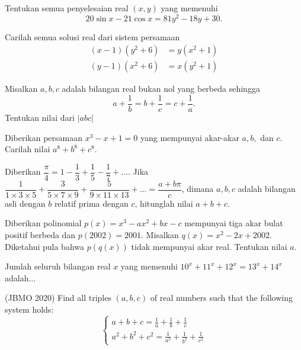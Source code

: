 \documentclass[12pt]{scrartcl}
\begin{document}
    \begin{soalbaru}
    Tentukan semua penyelesaian real $(x,y)$ yang memenuhi
    $$20\sin x-21 \cos x = 81y^2-18y+30.$$
    \end{soalbaru}
    
    \begin{soalbaru}
    Carilah semua solusi real dari sistem persamaan
    \begin{align*}
        (x-1)(y^2+6) &= y(x^2+1)\\
        (y-1)(x^2+6) &= x(y^2+1)
    \end{align*}
    \end{soalbaru}
    
    \begin{soalbaru}
    Misalkan $a,b,c$ adalah bilangan real bukan nol yang berbeda sehingga 
    $$a+\dfrac{1}{b}=b+\dfrac{1}{c}=c+\dfrac{1}{a}.$$
    Tentukan nilai dari $|abc|$
    \end{soalbaru}
    
    \begin{soalbaru}
		Diberikan persamaan $x^3-x+1=0$ yang mempunyai akar-akar $a,b,$ dan $c$. Carilah nilai $a^8+b^8+c^8$.
	\end{soalbaru}
	
	\begin{soalbaru}
			Diberikan $\dfrac{\pi}{4} = 1 - \dfrac{1}{3}+\dfrac{1}{5}-\dfrac{1}{7}+\dots$. Jika  $\dfrac{1}{1 \times 3 \times 5}+\dfrac{3}{5 \times 7 \times 9}+\dfrac{5}{9 \times 11 \times 13}+\dots = \dfrac{a+b\pi}{c}$, dimana $a,b,c$ adalah bilangan asli dengan $b$ relatif prima dengan $c$, hitunglah nilai $a+b+c$.
		\end{soalbaru}
	
	\begin{soalbaru}
		Diberikan polinomial $p(x)=x^3-ax^2+bx-c$ mempunyai tiga akar bulat positif berbeda dan $p(2002)=2001$. Misalkan $q(x)=x^2-2x+2002$. Diketahui pula bahwa $p(q(x))$ tidak mempunyai akar real. Tentukan nilai $a$.
	\end{soalbaru}
	
	\begin{soalbaru}
		Jumlah seluruh bilangan real $x$ yang memenuhi $10^x+11^x+12^x=13^x+14^x$ adalah... %
	\end{soalbaru}

    \begin{soalbaru}(JBMO 2020)
    Find all triples $(a,b,c)$ of real numbers such that the following system holds:
$$\begin{cases} a+b+c=\frac{1}{a}+\frac{1}{b}+\frac{1}{c} \\a^2+b^2+c^2=\frac{1}{a^2}+\frac{1}{b^2}+\frac{1}{c^2}\end{cases}$$
    \end{soalbaru}
    
\end{document}
